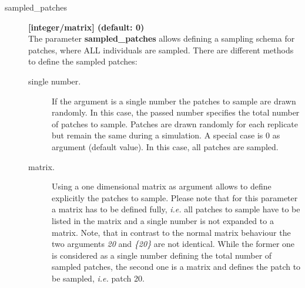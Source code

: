 \documentclass[letterpaper,12pt,oneside]{book}
\begin{document}
\begin{description}
\item[sampled\_patches] \textbf{[integer/matrix] (default: 0)}\\ 
The parameter \textbf{sampled\_patches} allows defining a sampling schema for patches, where ALL individuals are sampled. There are different methods to define the sampled patches:
\begin{description}
\item[single number.] If the argument is a single number the patches to sample are drawn randomly. In this case, the passed number specifies the total number of patches to sample. Patches are drawn randomly for each replicate but remain the same during a simulation. A special case is 0 as argument (default value). In this case, all patches are sampled. 
\item[matrix.] Using a one dimensional matrix as argument allows to define explicitly the patches to sample. Please note that for this parameter a matrix has to be defined fully, \textit{i.e.} all patches to sample have to be listed in the matrix and a single number is not expanded to a matrix. Note, that in contrast to the normal matrix behaviour the two arguments \textit{20} and \textit{\{20\}} are not identical. While the former one is considered as a single number defining the total number of sampled patches, the second one is a matrix and defines the patch to be sampled, \textit{i.e.} patch 20.  
\end{description}


\end{description}
\end{document}
